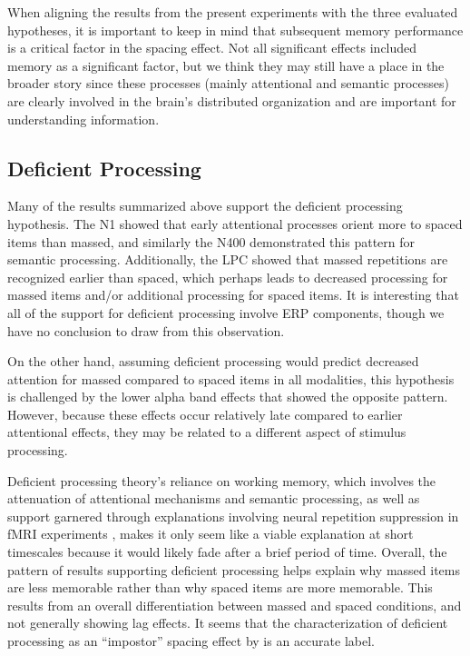 When aligning the results from the present experiments with the three evaluated hypotheses, it is important to keep in mind that subsequent memory performance is a critical factor in the spacing effect.  Not all significant effects included memory as a significant factor, but we think they may still have a place in the broader story since these processes (mainly attentional and semantic processes) are clearly involved in the brain's distributed organization and are important for understanding information.

\subsection{Deficient Processing}

Many of the results summarized above support the deficient processing hypothesis.  The N1 showed that early attentional processes orient more to spaced items than massed, and similarly the N400 demonstrated this pattern for semantic processing.  Additionally, the LPC showed that massed repetitions are recognized earlier than spaced, which perhaps leads to decreased processing for massed items and/or additional processing for spaced items.  It is interesting that all of the support for deficient processing involve ERP components, though we have no conclusion to draw from this observation.

On the other hand, assuming deficient processing would predict decreased attention for massed compared to spaced items in all modalities, this hypothesis is challenged by the lower alpha band effects that showed the opposite pattern.  However, because these effects occur relatively late compared to earlier attentional effects, they may be related to a different aspect of stimulus processing.

Deficient processing theory's reliance on working memory, which involves the attenuation of attentional mechanisms and semantic processing, as well as support garnered through explanations involving neural repetition suppression in fMRI experiments \cite{CallSchw2010,XueEtal2011}, makes it only seem like a viable explanation at short timescales because it would likely fade after a brief period of time.
Overall, the pattern of results supporting deficient processing helps explain why massed items are less memorable rather than why spaced items are more memorable.  This results from an overall differentiation between massed and spaced conditions, and not generally showing lag effects.
It seems that the characterization of deficient processing as an ``impostor'' spacing effect by  is an accurate label.

